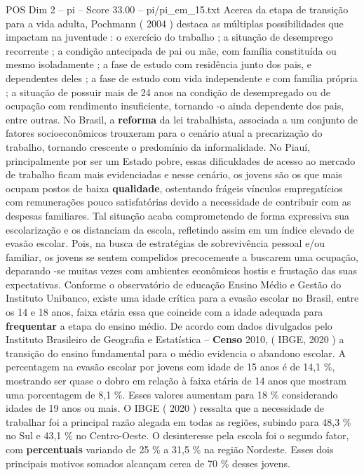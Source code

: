 \begin{textsample}{POS Dim 2 – pi – Score 33.00 – pi/pi\_em\_15.txt}
Acerca da etapa de transição para a vida adulta, Pochmann ( 2004 ) destaca as múltiplas possibilidades que impactam na juventude : o exercício do trabalho ; a situação de desemprego recorrente ; a condição antecipada de pai ou mãe, com família constituída ou mesmo isoladamente ; a fase de estudo com residência junto dos pais, e dependentes deles ; a fase de estudo com vida independente e com família própria ; a situação de possuir mais de 24 anos na condição de desempregado ou de ocupação com rendimento insuficiente, tornando -o ainda dependente dos pais, entre outras.
No Brasil, a \textbf{reforma} da lei trabalhista, associada a um conjunto de fatores socioeconômicos trouxeram para o cenário atual a precarização do trabalho, tornando crescente o predomínio da informalidade.
No Piauí, principalmente por ser um Estado pobre, essas dificuldades de acesso ao mercado de trabalho ficam mais evidenciadas e nesse cenário, os jovens são os que mais ocupam postos de baixa \textbf{qualidade}, ostentando frágeis vínculos empregatícios com remunerações pouco satisfatórias devido a necessidade de contribuir com as despesas familiares.
Tal situação acaba comprometendo de forma expressiva sua escolarização e os distanciam da escola, refletindo assim em um índice elevado de evasão escolar.
Pois, na busca de estratégias de sobrevivência pessoal e/ou familiar, os jovens se sentem compelidos precocemente a buscarem uma ocupação, deparando -se muitas vezes com ambientes econômicos hostis e frustação das suas expectativas.
Conforme o observatório de educação Ensino Médio e Gestão do Instituto Unibanco, existe uma idade crítica para a evasão escolar no Brasil, entre os 14 e 18 anos, faixa etária essa que coincide com a idade adequada para \textbf{frequentar} a etapa do ensino médio.
De acordo com dados divulgados pelo Instituto Brasileiro de Geografia e Estatística – \textbf{Censo} 2010, ( IBGE, 2020 ) a transição do ensino fundamental para o médio evidencia o abandono escolar.
A percentagem na evasão escolar por jovens com idade de 15 anos é de 14,1 \%, mostrando ser quase o dobro em relação à faixa etária de 14 anos que mostram uma porcentagem de 8,1 \%.
Esses valores aumentam para 18 \% considerando idades de 19 anos ou mais.
O IBGE ( 2020 ) ressalta que a necessidade de trabalhar foi a principal razão alegada em todas as regiões, subindo para 48,3 \% no Sul e 43,1 \% no Centro-Oeste.
O desinteresse pela escola foi o segundo fator, com \textbf{percentuais} variando de 25 \% a 31,5 \% na região Nordeste.
Esses dois principais motivos somados alcançam cerca de 70 \% desses jovens.

\end{textsample}
